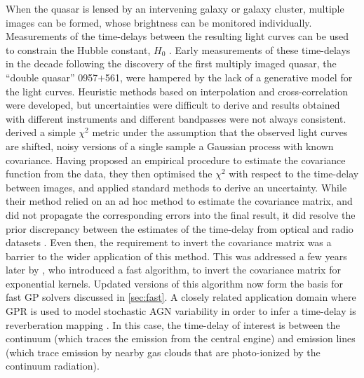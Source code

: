 \documentclass[letterpaper]{ar-1col}
\begin{document}
When the quasar is lensed by an intervening galaxy or galaxy cluster, multiple images can be formed, whose brightness can be monitored individually.
Measurements of the time-delays between the resulting light curves can be used to constrain the Hubble constant, $H_0$ \citep{doi:10.1146/annurev.aa.30.090192.001523}.
Early measurements of these time-delays in the decade following the discovery of the first multiply imaged quasar, the ``double quasar'' 0957$+$561, were hampered by the lack of a generative model for the light curves.
Heuristic methods based on interpolation and cross-correlation were developed, but uncertainties were difficult to derive and results obtained with different instruments and different bandpasses were not always consistent.
\citet{prh92a} derived a simple $\chi^2$ metric under the assumption that the observed light curves are shifted, noisy versions of a single sample a Gaussian process with known covariance.
Having proposed an empirical procedure to estimate the covariance function from the data, they then optimised the $\chi^2$ with respect to the time-delay between images, and applied standard methods to derive an uncertainty.
While their method relied on an ad hoc method to estimate the covariance matrix, and did not propagate the corresponding errors into the final result, it did resolve the prior discrepancy between the estimates of the time-delay from optical and radio datasets \citep{prh92b}.
Even then, the requirement to invert the covariance matrix was a barrier to the wider application of this method.
This was addressed a few years later by \citet{pr95}, who introduced a fast algorithm, to invert the covariance matrix for exponential kernels.
Updated versions of this algorithm now form the basis for fast GP solvers discussed in \autoref{sec:fast}. A closely related application domain where GPR is used to model stochastic AGN variability in order to infer a time-delay is reverberation mapping \citep[see e.g.][]{2011ApJ...735...80Z}. In this case, the time-delay of interest is between the continuum (which traces the emission from the central engine) and emission lines (which trace emission by nearby gas clouds that are photo-ionized by the continuum radiation). 
\end{document}
